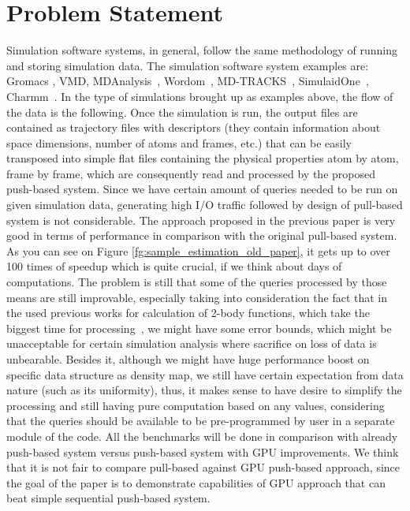 \documentclass[12pt,letterpaper]{report}
\begin{document}
\section{Problem Statement}
\hspace{3em} Simulation software systems, in general, follow the same methodology of running and storing simulation data. The simulation software system examples are: Gromacs \cite{GROMACS4}, VMD\cite{VMD}, MDAnalysis~\cite{MDAnalysis}, Wordom~\cite{wordom}, MD-TRACKS~\cite{MDtracks}, SimulaidOne~\cite{Simulaid}, Charmm~\cite{CHARMM}. In the type of simulations brought up as examples above, the flow of the data is the following. Once the simulation is run, the output files are contained as trajectory files with descriptors (they contain information about space dimensions, number of atoms and frames, etc.) that can be easily transposed into simple flat files containing the physical properties atom by atom, frame by frame, which are consequently read and processed by the proposed push-based system. Since we have certain amount of queries needed to be run on given simulation data, generating high I/O traffic followed by design of pull-based system is not considerable. The approach proposed in the previous paper is very good in terms of performance in comparison with the original pull-based system\cite{mainPaper}. As you can see on Figure \ref{fg:sample_estimation_old_paper}, it gets up to over 100 times of speedup which is quite crucial, if we think about days of computations. The problem is still that some of the queries processed by those means are still improvable, especially taking into consideration the fact that in the used previous works for calculation of 2-body functions, which take the biggest time for processing~\cite{ytu:icde09, EDBT12}, we might have some error bounds, which might be unacceptable for certain simulation analysis where sacrifice on loss of data is unbearable. Besides it, although we might have huge performance boost on specific data structure as density map, we still have certain expectation from data nature (such as its uniformity), thus, it makes sense to have desire to simplify the processing and still having pure computation based on any values, considering that the queries should be available to be pre-programmed by user in a separate module of the code. All the benchmarks will be done in comparison with already push-based system versus push-based system with GPU improvements. We think that it is  not fair to compare pull-based against GPU push-based approach, since the goal of the paper is to demonstrate capabilities of GPU approach that can beat simple sequential push-based system.
\end{document}
